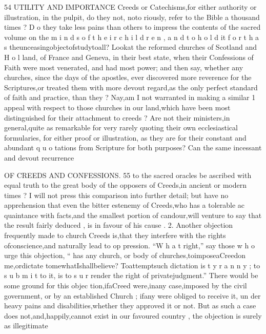 \documentclass[
]{book}
\begin{document}
54
UTILITY AND IMPORTANCE
Creeds or Catechisms,for either authority or
illustration, in the pulpit, do they not, noto riously, refer to the Bible a thousand times ?
D o they take less pains than others to impress the contents of the sacred volume on the
m i n d s o f t h e i r c h i l d r e n , a n d t o h o l d it f o r t h a s theunceasingobjectofstudytoall? Lookat the reformed churches of Scotland and H o l land, of France and Geneva, in their best state, when their Confessions of Faith were most venerated, and had most power; and then say, whether any churches, since the days of the apostles, ever discovered more reverence for the Scriptures,or treated them with more devout regard,as the only perfect
standard of faith and practice, than they ?
Nay,am I not warranted in making a similar 1 appeal with respect to those churches in our land,which have been most distinguished for
their attachment to creeds ? Are not their ministers,in general,quite as remarkable for very rarely quoting their own ecclesiastical formularies, for either proof or illustration, as they are for their constant and abundant q u o tations from Scripture for both purposes? Can the same incessant and devout recurrence

OF CREEDS AND CONFESSIONS. 55
to the sacred oracles be ascribed with equal truth to the great body of the opposers of Creeds,in ancient or modern times ? I will not press this comparison into further detail; but have no apprehension that even the bitter estenemy of Creeds,who has a tolerable ac
quaintance with facts,and the smallest portion of candour,will venture to say that the result fairly deduced , is in favour of his cause .
2. Another objection frequently made to church Creeds is,that they interfere with the rights ofconscience,and naturally lead to op pression. ``W h a t right,'' say those w h o urge
this objection, `` has any church, or body of churches,toimposeaCreedon me,ordictate tomewhatIshallbelieve? Toattemptsuch dictation is t y r a n n y ; to s u b m i t to it, is to s u r render the right of privatejudgment.''
There would be some ground for this objec tion,ifaCreed were,inany case,imposed by the civil government, or by an established Church ; ifany were obliged to receive it, un
der heavy pains and disabilities,whether they approved it or not. But as such a case does
not,and,happily,cannot exist in our favoured country , the objection is surely as illegitimate
\end{document}

